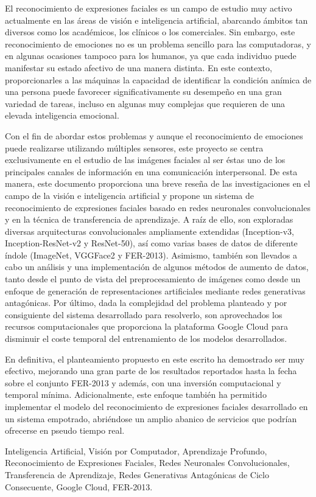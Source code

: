 \thispagestyle{plain}

\begin{resumen}
El reconocimiento de expresiones faciales es un campo de estudio muy activo actualmente en las áreas de visión e inteligencia artificial, abarcando ámbitos tan diversos como los académicos, los clínicos o los comerciales. Sin embargo, este reconocimiento de emociones no es un problema sencillo para las computadoras, y en algunas ocasiones tampoco para los humanos, ya que cada individuo puede manifestar su estado afectivo de una manera distinta. En este contexto, proporcionarles a las máquinas la capacidad de identificar la condición anímica de una persona puede favorecer significativamente su desempeño en una gran variedad de tareas, incluso en algunas muy complejas que requieren de una elevada inteligencia emocional.

Con el fin de abordar estos problemas y aunque el reconocimiento de emociones puede realizarse utilizando múltiples sensores, este proyecto se centra exclusivamente en el estudio de las imágenes faciales al ser éstas uno de los principales canales de información en una comunicación interpersonal. De esta manera, este documento proporciona una breve reseña de las investigaciones en el campo de la visión e inteligencia artificial y propone un sistema de reconocimiento de expresiones faciales basado en redes neuronales convolucionales y en la técnica de transferencia de aprendizaje. A raíz de ello, son exploradas diversas arquitecturas convolucionales ampliamente extendidas (Inception-v3, Inception-ResNet-v2 y ResNet-50), así como varias bases de datos de diferente índole (ImageNet, VGGFace2 y FER-2013). Asimismo, también son llevados a cabo un análisis y una implementación de algunos métodos de aumento de datos, tanto desde el punto de vista del preprocesamiento de imágenes como desde un enfoque de generación de representaciones artificiales mediante redes generativas antagónicas. Por último, dada la complejidad del problema planteado y por consiguiente del sistema desarrollado para resolverlo, son aprovechados los recursos computacionales que proporciona la plataforma Google Cloud para disminuir el coste temporal del entrenamiento de los modelos desarrollados.

En definitiva, el planteamiento propuesto en este escrito ha demostrado ser muy efectivo, mejorando una gran parte de los resultados reportados hasta la fecha sobre el conjunto FER-2013 y además, con una inversión computacional y temporal mínima. Adicionalmente, este enfoque también ha permitido implementar el modelo del reconocimiento de expresiones faciales desarrollado en un sistema empotrado, abriéndose un amplio abanico de servicios que podrían ofrecerse en pseudo tiempo real.
\end{resumen}

\begin{palabrasclave}
Inteligencia Artificial, Visión por Computador, Aprendizaje Profundo, Reconocimiento de Expresiones Faciales, Redes Neuronales Convolucionales, Transferencia de Aprendizaje, Redes Generativas Antagónicas de Ciclo Consecuente, Google Cloud, FER-2013.
\end{palabrasclave}
